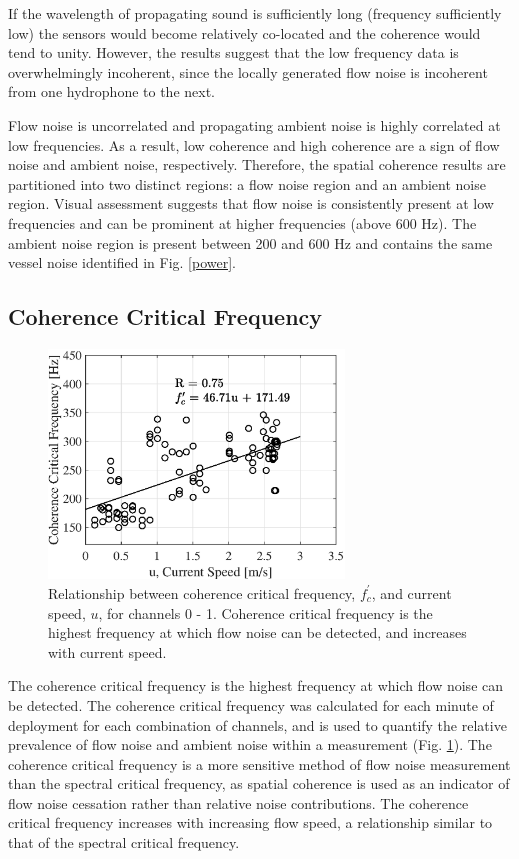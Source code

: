 \documentclass[12pt,journal,onecolumn]{IEEEtran}
\begin{document}
If the wavelength of propagating sound is sufficiently long (frequency sufficiently low) the sensors would become relatively co-located and the coherence would tend to unity. 
However, the results suggest that the low frequency data is overwhelmingly incoherent, since the locally generated flow noise is incoherent from one hydrophone to the next. 

Flow noise is uncorrelated and propagating ambient noise is highly correlated at low frequencies. As a result, low coherence and high coherence are a sign of flow noise and ambient noise, respectively. Therefore, the spatial coherence results are partitioned into two distinct regions: a flow noise region and an ambient noise region. Visual assessment suggests that flow noise is consistently present at low frequencies and can be prominent at higher frequencies (above 600 Hz). The ambient noise region is present between 200 and 600 Hz and contains the same vessel noise identified in Fig. \ref{power}. 



\subsection{Coherence Critical Frequency}
\begin{figure}[!t]
	\begin{center}
		\includegraphics[width=0.7\textwidth]{figure6.eps}
	\end{center}%
	\caption[Spatial coherence thresholding results.]{
	\label{f:c_thresh}
	Relationship between coherence critical frequency, $f^\prime_c$, and current speed, $u$, for channels 0 - 1. Coherence critical frequency is the highest frequency at which flow noise can be detected, and increases with current speed. }
\end{figure}
The coherence critical frequency is the highest frequency at which flow noise can be detected. The coherence critical frequency was calculated for each minute of deployment for each combination of channels, and is used to quantify the relative prevalence of flow noise and ambient noise within a measurement (Fig. \ref{f:c_thresh}). The coherence critical frequency is a more sensitive method of flow noise measurement than the spectral critical frequency, as spatial coherence is used as an indicator of flow noise cessation rather than relative noise contributions. The coherence critical frequency increases with increasing flow speed, a relationship similar to that of the spectral critical frequency. 
\end{document}
